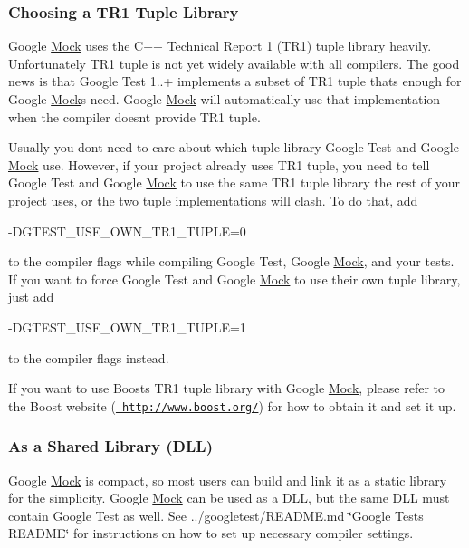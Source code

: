 \subsubsection*{Choosing a T\+R1 Tuple Library}

Google \mbox{\hyperlink{class_mock}{Mock}} uses the C++ Technical Report 1 (T\+R1) tuple library heavily. Unfortunately T\+R1 tuple is not yet widely available with all compilers. The good news is that Google Test 1..+ implements a subset of T\+R1 tuple that\textquotesingle{}s enough for Google \mbox{\hyperlink{class_mock}{Mock}}\textquotesingle{}s need. Google \mbox{\hyperlink{class_mock}{Mock}} will automatically use that implementation when the compiler doesn\textquotesingle{}t provide T\+R1 tuple.

Usually you don\textquotesingle{}t need to care about which tuple library Google Test and Google \mbox{\hyperlink{class_mock}{Mock}} use. However, if your project already uses T\+R1 tuple, you need to tell Google Test and Google \mbox{\hyperlink{class_mock}{Mock}} to use the same T\+R1 tuple library the rest of your project uses, or the two tuple implementations will clash. To do that, add \begin{DoxyVerb}-DGTEST_USE_OWN_TR1_TUPLE=0
\end{DoxyVerb}


to the compiler flags while compiling Google Test, Google \mbox{\hyperlink{class_mock}{Mock}}, and your tests. If you want to force Google Test and Google \mbox{\hyperlink{class_mock}{Mock}} to use their own tuple library, just add \begin{DoxyVerb}-DGTEST_USE_OWN_TR1_TUPLE=1
\end{DoxyVerb}


to the compiler flags instead.

If you want to use Boost\textquotesingle{}s T\+R1 tuple library with Google \mbox{\hyperlink{class_mock}{Mock}}, please refer to the Boost website (\href{http://www.boost.org/}{\texttt{ http\+://www.\+boost.\+org/}}) for how to obtain it and set it up.

\subsubsection*{As a Shared Library (D\+LL)}

Google \mbox{\hyperlink{class_mock}{Mock}} is compact, so most users can build and link it as a static library for the simplicity. Google \mbox{\hyperlink{class_mock}{Mock}} can be used as a D\+LL, but the same D\+LL must contain Google Test as well. See ../googletest/\+R\+E\+A\+D\+ME.md \char`\"{}\+Google Test\textquotesingle{}s R\+E\+A\+D\+M\+E\char`\"{} for instructions on how to set up necessary compiler settings.

